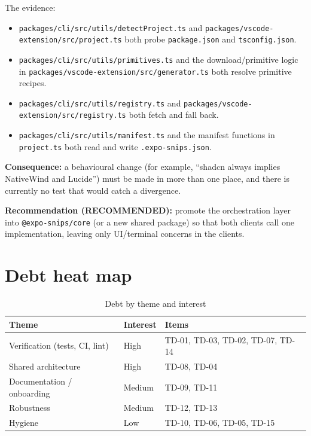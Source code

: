 The evidence:

\begin{itemize}
  \item \texttt{packages/cli/src/utils/detectProject.ts} and
        \texttt{packages/vscode-extension/src/project.ts} both probe
        \texttt{package.json} and \texttt{tsconfig.json}.
  \item \texttt{packages/cli/src/utils/primitives.ts} and the download/primitive
        logic in \texttt{packages/vscode-extension/src/generator.ts} both resolve
        primitive recipes.
  \item \texttt{packages/cli/src/utils/registry.ts} and
        \texttt{packages/vscode-extension/src/registry.ts} both fetch and fall
        back.
  \item \texttt{packages/cli/src/utils/manifest.ts} and the manifest functions in
        \texttt{project.ts} both read and write \texttt{.expo-snips.json}.
\end{itemize}

\textbf{Consequence:} a behavioural change (for example, ``shadcn always implies
NativeWind and Lucide'') must be made in more than one place, and there is
currently no test that would catch a divergence.

\textbf{Recommendation (RECOMMENDED):} promote the orchestration layer into
\texttt{@expo-snips/core} (or a new shared package) so that both clients call one
implementation, leaving only UI/terminal concerns in the clients.

\section{Debt heat map}

\begin{table}[H]
\centering
\caption{Debt by theme and interest}
\begin{tabular}{@{}L{5cm}L{1.7cm}L{7.5cm}@{}}
\toprule
\textbf{Theme} & \textbf{Interest} & \textbf{Items} \\
\midrule
Verification (tests, CI, lint) & High & TD-01, TD-03, TD-02, TD-07, TD-14 \\
Shared architecture & High & TD-08, TD-04 \\
Documentation / onboarding & Medium & TD-09, TD-11 \\
Robustness & Medium & TD-12, TD-13 \\
Hygiene & Low & TD-10, TD-06, TD-05, TD-15 \\
\bottomrule
\end{tabular}
\end{table}

